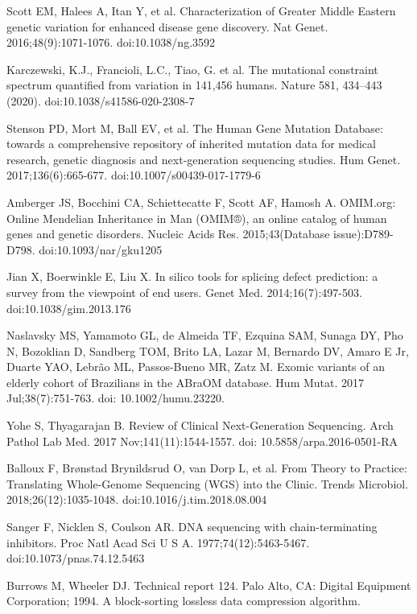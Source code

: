 \documentclass[a4paper,12pt]{article}
\begin{document}
\begin{thebibliography}{100}
Scott EM, Halees A, Itan Y, et al. Characterization of Greater Middle Eastern genetic variation for enhanced disease gene discovery. Nat Genet. 2016;48(9):1071-1076. doi:10.1038/ng.3592

Karczewski, K.J., Francioli, L.C., Tiao, G. et al. The mutational constraint spectrum quantified from variation in 141,456 humans. Nature 581, 434–443 (2020). doi:10.1038/s41586-020-2308-7

Stenson PD, Mort M, Ball EV, et al. The Human Gene Mutation Database: towards a comprehensive repository of inherited mutation data for medical research, genetic diagnosis and next-generation sequencing studies. Hum Genet. 2017;136(6):665-677. doi:10.1007/s00439-017-1779-6

Amberger JS, Bocchini CA, Schiettecatte F, Scott AF, Hamosh A. OMIM.org: Online Mendelian Inheritance in Man (OMIM®), an online catalog of human genes and genetic disorders. Nucleic Acids Res. 2015;43(Database issue):D789-D798. doi:10.1093/nar/gku1205

Jian X, Boerwinkle E, Liu X. In silico tools for splicing defect prediction: a survey from the viewpoint of end users. Genet Med. 2014;16(7):497-503. doi:10.1038/gim.2013.176

Naslavsky MS, Yamamoto GL, de Almeida TF, Ezquina SAM, Sunaga DY, Pho N, Bozoklian D, Sandberg TOM, Brito LA, Lazar M, Bernardo DV, Amaro E Jr, Duarte YAO, Lebrão ML, Passos-Bueno MR, Zatz M. Exomic variants of an elderly cohort of Brazilians in the ABraOM database. Hum Mutat. 2017 Jul;38(7):751-763. doi: 10.1002/humu.23220.


Yohe S, Thyagarajan B. Review of Clinical Next-Generation Sequencing. Arch Pathol Lab Med. 2017 Nov;141(11):1544-1557. doi: 10.5858/arpa.2016-0501-RA

Balloux F, Brønstad Brynildsrud O, van Dorp L, et al. From Theory to Practice: Translating Whole-Genome Sequencing (WGS) into the Clinic. Trends Microbiol. 2018;26(12):1035-1048. doi:10.1016/j.tim.2018.08.004

Sanger F, Nicklen S, Coulson AR. DNA sequencing with chain-terminating inhibitors. Proc Natl Acad Sci U S A. 1977;74(12):5463-5467. doi:10.1073/pnas.74.12.5463

Burrows M, Wheeler DJ. Technical report 124. Palo Alto, CA: Digital Equipment Corporation; 1994. A block-sorting lossless data compression algorithm.


\end{thebibliography}
\end{document}
